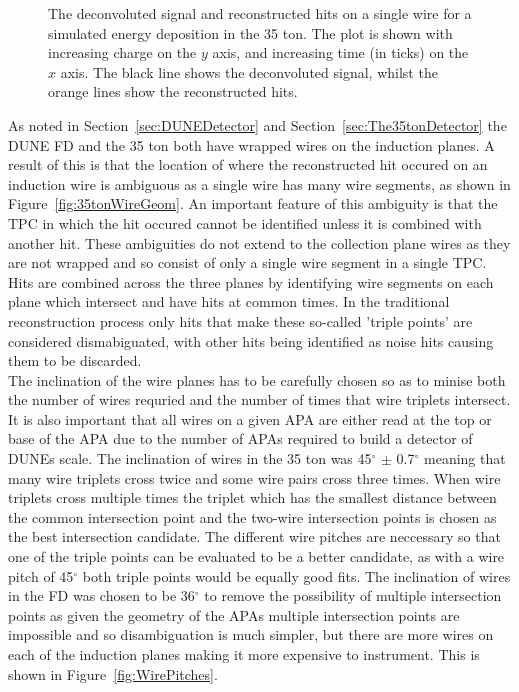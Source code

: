 \begin{figure}[h]
  \centering
  \caption[Reconstructed hits from a simulated energy deposition]{The deconvoluted signal and reconstructed hits on a single wire for a simulated energy deposition in the 35 ton. The plot is shown with increasing charge on the $y$ axis, and increasing time (in ticks) on the $x$ axis. The black line shows the deconvoluted signal, whilst the orange lines show the reconstructed hits.}
  \label{fig:LotsOfHits}
\end{figure}

As noted in Section~\ref{sec:DUNEDetector} and Section~\ref{sec:The35tonDetector} the DUNE FD and the 35 ton both have wrapped wires on the induction planes. A result of this is that the location of where the reconstructed hit occured on an induction wire is ambiguous as a single wire has many wire segments, as shown in Figure~\ref{fig:35tonWireGeom}. An important feature of this ambiguity is that the TPC in which the hit occured cannot be identified unless it is combined with another hit. These ambiguities do not extend to the collection plane wires as they are not wrapped and so consist of only a single wire segment in a single TPC. Hits are combined across the three planes by identifying wire segments on each plane which intersect and have hits at common times. In the traditional reconstruction process only hits that make these so-called 'triple points' are considered dismabiguated, with other hits being identified as noise hits causing them to be discarded. \\

The inclination of the wire planes has to be carefully chosen so as to minise both the number of wires requried and the number of times that wire triplets intersect. It is also important that all wires on a given APA are either read at the top or base of the APA due to the number of APAs required to build a detector of DUNEs scale. The inclination of wires in the 35 ton was 45$^{\circ}$ $\pm$ 0.7$^{\circ}$ meaning that many wire triplets cross twice and some wire pairs cross three times. When wire triplets cross multiple times the triplet which has the smallest distance between the common intersection point and the two-wire intersection points is chosen as the best intersection candidate. The different wire pitches are neccessary so that one of the triple points can be evaluated to be a better candidate, as with a wire pitch of 45$^{\circ}$ both triple points would be equally good fits. The inclination of wires in the FD was chosen to be 36$^{\circ}$ to remove the possibility of multiple intersection points as given the geometry of the APAs multiple intersection points are impossible and so disambiguation is much simpler, but there are more wires on each of the induction planes making it more expensive to instrument. This is shown in Figure~\ref{fig:WirePitches}.

